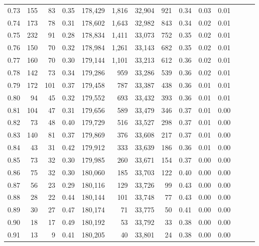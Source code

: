 \begin{tabular}{rrrrrrrrrrrrrr}
0.73 &    155 &   83 &  0.35 &  178,429 &    1,816 &  32,904 &     921 &  0.34 &  0.03 &      0.01 \\
0.74 &    173 &   78 &  0.31 &  178,602 &    1,643 &  32,982 &     843 &  0.34 &  0.02 &      0.01 \\
0.75 &    232 &   91 &  0.28 &  178,834 &    1,411 &  33,073 &     752 &  0.35 &  0.02 &      0.01 \\
0.76 &    150 &   70 &  0.32 &  178,984 &    1,261 &  33,143 &     682 &  0.35 &  0.02 &      0.01 \\
0.77 &    160 &   70 &  0.30 &  179,144 &    1,101 &  33,213 &     612 &  0.36 &  0.02 &      0.01 \\
0.78 &    142 &   73 &  0.34 &  179,286 &      959 &  33,286 &     539 &  0.36 &  0.02 &      0.01 \\
0.79 &    172 &  101 &  0.37 &  179,458 &      787 &  33,387 &     438 &  0.36 &  0.01 &      0.01 \\
0.80 &     94 &   45 &  0.32 &  179,552 &      693 &  33,432 &     393 &  0.36 &  0.01 &      0.01 \\
0.81 &    104 &   47 &  0.31 &  179,656 &      589 &  33,479 &     346 &  0.37 &  0.01 &      0.00 \\
0.82 &     73 &   48 &  0.40 &  179,729 &      516 &  33,527 &     298 &  0.37 &  0.01 &      0.00 \\
0.83 &    140 &   81 &  0.37 &  179,869 &      376 &  33,608 &     217 &  0.37 &  0.01 &      0.00 \\
0.84 &     43 &   31 &  0.42 &  179,912 &      333 &  33,639 &     186 &  0.36 &  0.01 &      0.00 \\
0.85 &     73 &   32 &  0.30 &  179,985 &      260 &  33,671 &     154 &  0.37 &  0.00 &      0.00 \\
0.86 &     75 &   32 &  0.30 &  180,060 &      185 &  33,703 &     122 &  0.40 &  0.00 &      0.00 \\
0.87 &     56 &   23 &  0.29 &  180,116 &      129 &  33,726 &      99 &  0.43 &  0.00 &      0.00 \\
0.88 &     28 &   22 &  0.44 &  180,144 &      101 &  33,748 &      77 &  0.43 &  0.00 &      0.00 \\
0.89 &     30 &   27 &  0.47 &  180,174 &       71 &  33,775 &      50 &  0.41 &  0.00 &      0.00 \\
0.90 &     18 &   17 &  0.49 &  180,192 &       53 &  33,792 &      33 &  0.38 &  0.00 &      0.00 \\
0.91 &     13 &    9 &  0.41 &  180,205 &       40 &  33,801 &      24 &  0.38 &  0.00 &      0.00 \\

\end{tabular}
